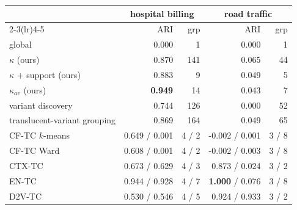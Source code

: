 \begin{tabular}{lrrrr}
\toprule
 & \multicolumn{2}{c}{hospital billing} & \multicolumn{2}{c}{road traffic} \\
\cmidrule(lr){2-3}\cmidrule(lr){4-5}
 & ARI & grp & ARI & grp \\
\midrule
global & 0.000 & 1 & 0.000 & 1 \\
$\kappa$ (ours) & 0.870 & 141 & 0.065 & 44 \\
$\kappa$ + support (ours) & 0.883 & 9 & 0.049 & 5 \\
$\kappa_{\mathit{av}}$ (ours) & \textbf{0.949} & 14 & 0.043 & 7 \\
variant discovery & 0.744 & 126 & 0.000 & 52 \\
translucent-variant grouping & 0.869 & 164 & 0.049 & 65 \\
\midrule
CF-TC $k$-means & 0.649 / 0.001 & 4 / 2 & -0.002 / 0.001 & 3 / 8 \\
CF-TC Ward & 0.608 / 0.001 & 4 / 2 & -0.002 / 0.003 & 3 / 8 \\
CTX-TC & 0.673 / 0.629 & 4 / 3 & 0.873 / 0.024 & 3 / 2 \\
EN-TC & 0.944 / 0.928 & 4 / 7 & \textbf{1.000} / 0.076 & 3 / 8 \\
D2V-TC & 0.530 / 0.546 & 4 / 5 & 0.924 / 0.933 & 3 / 2 \\
\bottomrule
\end{tabular}
